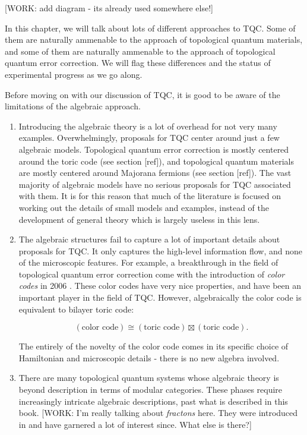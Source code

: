 [WORK: add diagram - its already used somewhere else!]

In this chapter, we will talk about lots of different approaches to TQC. Some of them are naturally ammenable to the approach of topological quantum materials, and some of them are naturally ammenable to the approach of topological quantum error correction. We will flag these differences and the status of experimental progress as we go along.

Before moving on with our discussion of TQC, it is good to be aware of the limitations of the algebraic approach.

\begin{enumerate}
\item Introducing the algebraic theory is a lot of overhead for not very many examples. Overwhelmingly, proposals for TQC center around just a few algebraic models. Topological quantum error correction is mostly centered around the toric code (see section [ref]), and topological quantum materials are mostly centered around Majorana fermions (see section [ref]). The vast majority of algebraic models have no serious proposals for TQC associated with them. It is for this reason that much of the literature is focused on working out the details of small models and examples, instead of the development of general theory which is largely useless in this lens.

\item The algebraic structures fail to capture a lot of important details about proposals for TQC. It only captures the high-level information flow, and none of the microscopic features. For example, a breakthrough in the field of topological quantum error correction come with the introduction of \textit{color codes} in 2006 \cite{bombin2006topological}. These color codes have very nice properties, and have been an important player in the field of TQC. However, algebraically the color code is equivalent to bilayer toric code:

$$(\text{color code})\cong (\text{toric code})\boxtimes (\text{toric code}).$$

The entirely of the novelty of the color code comes in its specific choice of Hamiltonian and microscopic details - there is no new algebra involved.

\item There are many topological quantum systems whose algebraic theory is beyond description in terms of modular categories. These phases require increasingly intricate algebraic descriptions, past what is described in this book. [WORK: I'm really talking about \textit{fractons} here. They were introduced in \cite{vijay2015new} and have garnered a lot of interest since.  What else is there?]
\end{enumerate}

